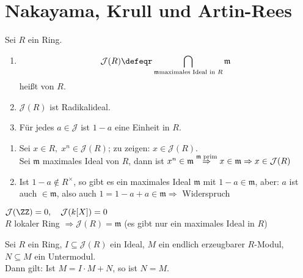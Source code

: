 \section{Nakayama, Krull und Artin-Rees}

\begin{DefBem}

Sei $R$ ein Ring.
\begin{enumerate}
	\item $$\mathcal{J}(R) \defeqr \bigcap_{\mathfrak{m}\text{\scriptsize maximales Ideal in }R}\mathfrak{m}$$ heißt  von $R$.
	\item $\mathcal{J}(R)$ ist Radikalideal.
	\item Für jedes $a \in \mathcal{J}$ ist $1-a$ eine Einheit in $R$.
\end{enumerate}

\end{DefBem}

\begin{Bew}

\begin{enumerate}
	\item Sei $x \in R, \; x^n \in \mathcal{J}(R)$; zu zeigen: $x \in \mathcal{J}(R)$.\\
	Sei $\mathfrak{m}$ maximales Ideal von $R$, dann ist $x^n \in \mathfrak{m} \overset{\mathfrak{m} \; \text{\scriptsize prim}}{\Rightarrow} x \in \mathfrak{m} \Rightarrow x \in \mathcal{J}(R)$
	\item Ist $1-a \notin R^{\times}$, so gibt es ein maximales Ideal $\mathfrak{m}$ mit $1-a \in \mathfrak{m}$, aber: $a$ ist auch $\in \mathfrak{m}$, also auch $1 = 1-a+a \in \mathfrak{m} \Rightarrow$ Widerspruch
\end{enumerate}
  
\end{Bew}

\begin{nnBsp}
  $\mathcal{J}(\ZZ) = 0, \quad \mathcal{J}(k[X]) = 0$\\
  $R$ lokaler Ring $\Rightarrow \mathcal{J}(R) = \mathfrak{m}$ (es gibt nur ein maximales Ideal in $R$)
\end{nnBsp}

\begin{Satz}
\label{Satz8}
  Sei $R$ ein Ring, $I \subseteq \mathcal{J}(R)$ ein Ideal, $M$ ein endlich erzeugbarer $R$-Modul, $N \subseteq M$ ein Untermodul.\\
  Dann gilt: Ist $M = I \cdot M + N$, so ist $N = M$.
\end{Satz}

